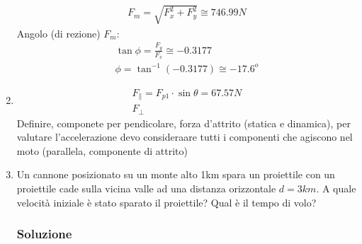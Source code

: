 \documentclass{report}
\begin{document}
\begin{enumerate}
\begin{eqnarray*}
  F_m=\sqrt{F_x^2+F_y^2} \cong 746.99N
\end{eqnarray*}
Angolo (di rezione) $F_m$:
\begin{eqnarray*}
  \tan \phi = \frac{F_y}{F_x}\cong  - 0.3177 \\
  \phi = \tan^{-1}\left(- 0.3177\right) \cong - 17.6^o
\end{eqnarray*}
\item
  \begin{eqnarray*}
    F_{\parallel}=F_{p1}\cdot \sin \theta = 67.57N\\
    F_{\perp}
  \end{eqnarray*}
  Definire, componete per pendicolare, forza d'attrito (statica e dinamica), per valutare l'accelerazione devo consideraare tutti i componenti che agiscono nel moto (parallela, componente di attrito)
\item Un cannone posizionato su un monte alto 1km spara un proiettile con un
  proiettile cade sulla vicina valle ad una distanza orizzontale $d=3km$. A quale
  velocità iniziale è stato sparato il proiettile? Qual è il tempo di volo?
  
\subsubsection{Soluzione}
\label{sec:sol8}


\end{enumerate}
\end{document}
